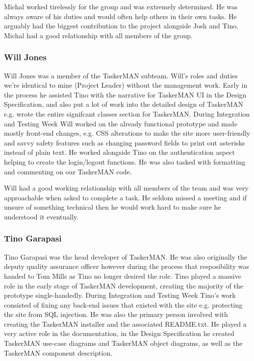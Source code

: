 \documentclass{project}
\begin{document}
Michal worked tirelessly for the group and was extremely determined. He was always aware of his duties and would often help others in their own tasks. He arguably had the biggest contribution to the project alongside Josh and Tino. Michal had a good relationship with all members of the group.
\subsubsection{Will Jones}
Will Jones was a member of the TaskerMAN subteam. Will's roles and duties we're identical to mine (Project Leader) without the management work. Early in the process he assisted Tino with the narrative for TaskerMAN UI in the Design Specification\cite{se.qa.ds}, and also put a lot of work into the detailed design of TaskerMAN e.g. wrote the entire signifcant classes section for TaskerMAN. During Integration and Testing Week Will worked on the already functional prototype and made mostly front-end changes, e.g. CSS alterations to make the site more user-friendly and savvy safety features such as changing password fields to print out asterisks instead of plain text. He worked alongside Tino on the authentication aspect helping to create the login/logout functions. He was also tasked with formatting and commenting on our TaskerMAN code.

Will had a good working relationship with all members of the team and was very approachable when asked to complete a task. He seldom missed a meeting and if unsure of something technical then he would work hard to make sure he understood it eventually.
\subsubsection{Tino Garapasi}
Tino Garapasi was the head developer of TaskerMAN. He was also originally the deputy quality assurance officer however during the process that resposibility was handed to Tom Mills as Tino no longer desired the role. Tino played a massive role in the early stage of TaskerMAN development, creating the majority of the prototype single-handedly. During Integration and Testing Week Tino's work consisted of fixing any back-end issues that existed with the site e.g. protecting the site from SQL injection. He was also the primary person involved with creating the TaskerMAN installer and the associated README.txt. He played a very active role in the documentation,  in the Design Specification\cite{se.qa.ds} he created TaskerMAN use-case diagrams and TaskerMAN object diagrams, as well as the TaskerMAN component description.
\end{document}
